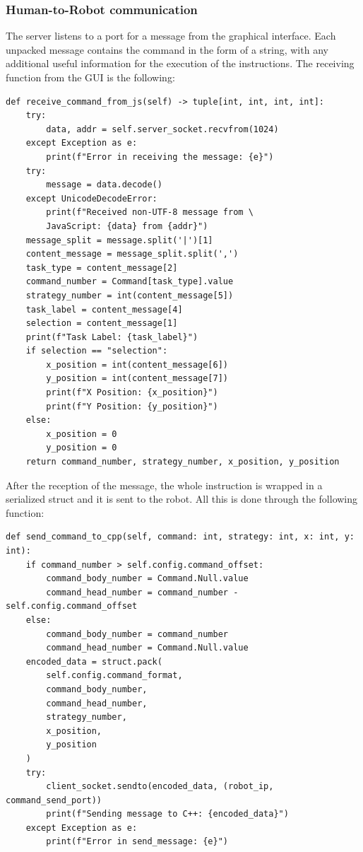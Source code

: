 \documentclass[a4paper, onecolumn, 12pt]{article}
\begin{document}
\subsubsection{Human-to-Robot communication}
The server listens to a port for a message from the graphical interface. Each unpacked message contains
the command in the form of a string, with any additional useful information for the execution of the instructions.
The receiving function from the GUI is the following:
\begin{verbatim}
def receive_command_from_js(self) -> tuple[int, int, int, int]:
    try:
        data, addr = self.server_socket.recvfrom(1024)
    except Exception as e:
        print(f"Error in receiving the message: {e}")
    try:
        message = data.decode()
    except UnicodeDecodeError:
        print(f"Received non-UTF-8 message from \
        JavaScript: {data} from {addr}")
    message_split = message.split('|')[1]
    content_message = message_split.split(',')
    task_type = content_message[2]
    command_number = Command[task_type].value
    strategy_number = int(content_message[5])
    task_label = content_message[4]
    selection = content_message[1]
    print(f"Task Label: {task_label}")
    if selection == "selection":
        x_position = int(content_message[6])
        y_position = int(content_message[7])
        print(f"X Position: {x_position}")
        print(f"Y Position: {y_position}")
    else:
        x_position = 0
        y_position = 0
    return command_number, strategy_number, x_position, y_position
\end{verbatim}

After the reception of the message, the whole instruction is wrapped in a serialized
struct and it is sent to the robot. All this is done through the following function:


\begin{verbatim}
def send_command_to_cpp(self, command: int, strategy: int, x: int, y: int):
    if command_number > self.config.command_offset:
        command_body_number = Command.Null.value
        command_head_number = command_number - self.config.command_offset
    else:
        command_body_number = command_number
        command_head_number = Command.Null.value
    encoded_data = struct.pack(
        self.config.command_format,
        command_body_number,
        command_head_number,
        strategy_number,
        x_position,
        y_position
    )
    try:
        client_socket.sendto(encoded_data, (robot_ip, command_send_port))
        print(f"Sending message to C++: {encoded_data}")
    except Exception as e:
        print(f"Error in send_message: {e}")
\end{verbatim}
\end{document}
